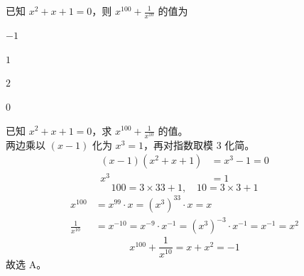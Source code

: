 \documentclass[12pt,a4paper]{exam-zh}
\begin{document}
\begin{question}
    已知 $x^2+x+1=0$，则 $\displaystyle x^{100}+\frac{1}{x^{10}}$ 的值为 \paren[A]
    \begin{choices}
        \item $-1$
        \item $1$
        \item $2$
        \item $0$
    \end{choices}
\end{question}

\begin{solution}
    已知 $x^2+x+1=0$，求 $\displaystyle x^{100}+\frac{1}{x^{10}}$ 的值。\\
    两边乘以 $(x-1)$ 化为 $x^3=1$，再对指数取模 $3$ 化简。\\
    \begin{align*}
        (x-1)(x^2+x+1) &= x^3-1 = 0 \\
        x^3 &= 1
    \end{align*}
    \[
        100 = 3\times 33 + 1, \quad 10 = 3\times 3 + 1
    \]
    \begin{align*}
        x^{100} &= x^{99}\cdot x = (x^3)^{33}\cdot x = x \\
        \frac{1}{x^{10}} &= x^{-10} = x^{-9}\cdot x^{-1} = (x^3)^{-3}\cdot x^{-1} = x^{-1} = x^2
    \end{align*}
    \[
        x^{100}+\frac{1}{x^{10}} = x + x^2 = -1
    \]
    故选 A。
\end{solution}

\end{document}
